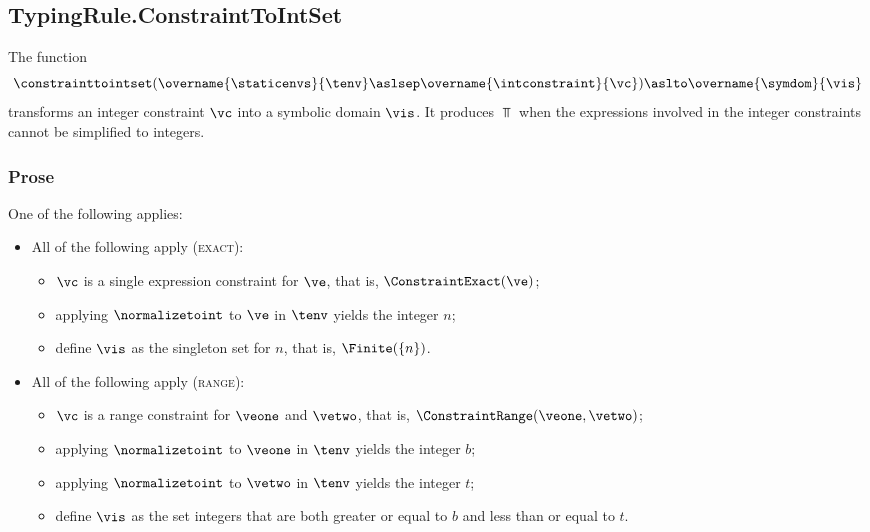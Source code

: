 \subsection{TypingRule.ConstraintToIntSet \label{sec:TypingRule.ConstraintToIntSet}}
\hypertarget{def-constrainttointset}{}
The function
\[
  \constrainttointset(
    \overname{\staticenvs}{\tenv} \aslsep
    \overname{\intconstraint}{\vc}
  ) \aslto
  \overname{\symdom}{\vis}
\]
transforms an integer constraint $\vc$ into a symbolic domain $\vis$.
It produces $\Top$ when the expressions involved in the integer constraints cannot be simplified
to integers.

\subsubsection{Prose}
One of the following applies:
\begin{itemize}
  \item All of the following apply (\textsc{exact}):
  \begin{itemize}
    \item $\vc$ is a single expression constraint for $\ve$, that is, $\ConstraintExact(\ve)$;
    \item applying $\normalizetoint$ to $\ve$ in $\tenv$ yields the integer $n$\ProseTerminateAs{\Top};
    \item define $\vis$ as the singleton set for $n$, that is, $\Finite(\{n\})$.
  \end{itemize}

  \item All of the following apply (\textsc{range}):
  \begin{itemize}
    \item $\vc$ is a range constraint for $\veone$ and $\vetwo$, that is, $\ConstraintRange(\veone, \vetwo)$;
    \item applying $\normalizetoint$ to $\veone$ in $\tenv$ yields the integer $b$\ProseTerminateAs{\Top};
    \item applying $\normalizetoint$ to $\vetwo$ in $\tenv$ yields the integer $t$\ProseTerminateAs{\Top};
    \item define $\vis$ as the set integers that are both greater or equal to $b$ and less than or equal to $t$.
  \end{itemize}
\end{itemize}

